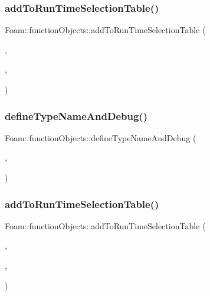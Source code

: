 \subsubsection{\texorpdfstring{add\+To\+Run\+Time\+Selection\+Table()}{addToRunTimeSelectionTable()}\hspace{0.1cm}{\footnotesize\ttfamily [7/8]}}
{\footnotesize\ttfamily Foam\+::function\+Objects\+::add\+To\+Run\+Time\+Selection\+Table (\begin{DoxyParamCaption}\item[{function\+Object}]{,  }\item[{\hyperlink{classFoam_1_1functionObjects_1_1FMUController}{F\+M\+U\+Controller}}]{,  }\item[{dictionary}]{ }\end{DoxyParamCaption})}

\mbox{\label{namespaceFoam_1_1functionObjects_a84c47bc05d42fa7891948581e7155b97}} 
\subsubsection{\texorpdfstring{define\+Type\+Name\+And\+Debug()}{defineTypeNameAndDebug()}\hspace{0.1cm}{\footnotesize\ttfamily [8/8]}}
{\footnotesize\ttfamily Foam\+::function\+Objects\+::define\+Type\+Name\+And\+Debug (\begin{DoxyParamCaption}\item[{\hyperlink{classFoam_1_1functionObjects_1_1FMUSimulator}{F\+M\+U\+Simulator}}]{,  }\item[{0}]{ }\end{DoxyParamCaption})}

\mbox{\label{namespaceFoam_1_1functionObjects_a7b35781ec40f18d4094339da704c5998}} 
\subsubsection{\texorpdfstring{add\+To\+Run\+Time\+Selection\+Table()}{addToRunTimeSelectionTable()}\hspace{0.1cm}{\footnotesize\ttfamily [8/8]}}
{\footnotesize\ttfamily Foam\+::function\+Objects\+::add\+To\+Run\+Time\+Selection\+Table (\begin{DoxyParamCaption}\item[{function\+Object}]{,  }\item[{\hyperlink{classFoam_1_1functionObjects_1_1FMUSimulator}{F\+M\+U\+Simulator}}]{,  }\item[{dictionary}]{ }\end{DoxyParamCaption})}

